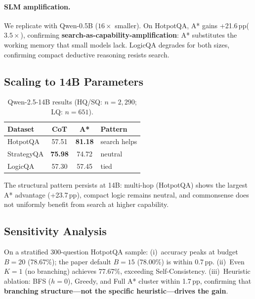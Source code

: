 \documentclass[11pt]{article}
\newcommand{\pp}{\,pp\xspace}
\begin{document}
\paragraph{SLM amplification.}
\label{sec:slm}
We replicate with Qwen-0.5B ($16\times$ smaller).  On HotpotQA, A* gains
+21.6\pp ($3.5\times$), confirming \textbf{search-as-capability-amplification}:
A* substitutes the working memory that small models lack.  LogicQA degrades
for both sizes, confirming compact deductive reasoning resists search.

\subsection{Scaling to 14B Parameters}
\label{sec:scaling}

\begin{table}[t]
\centering
\caption{Qwen-2.5-14B results (HQ/SQ: $n{=}2{,}290$; LQ: $n{=}651$).}
\label{tab:14b}
\small
\begin{tabular}{@{}lccl@{}}
\toprule
\textbf{Dataset} & \textbf{CoT} & \textbf{A*} & \textbf{Pattern} \\
\midrule
HotpotQA    & 57.51 & \textbf{81.18} & search helps \\
StrategyQA  & \textbf{75.98} & 74.72 & neutral \\
LogicQA     & 57.30 & 57.45 & tied \\
\bottomrule
\end{tabular}
\end{table}

The structural pattern persists at 14B: multi-hop (HotpotQA) shows the largest
A* advantage (+23.7\pp), compact logic remains neutral, and commonsense does
not uniformly benefit from search at higher capability.

\subsection{Sensitivity Analysis}
\label{sec:sensitivity}

On a stratified 300-question HotpotQA sample: (i)~accuracy peaks at budget
$B{=}20$ (78.67\%); the paper default $B{=}15$ (78.00\%) is within 0.7\pp.
(ii)~Even $K{=}1$ (no branching) achieves 77.67\%, exceeding Self-Consistency.
(iii)~Heuristic ablation: BFS ($h{=}0$), Greedy, and Full A* cluster within
1.7\pp, confirming that \textbf{branching structure---not the specific
heuristic---drives the gain}.

\end{document}
